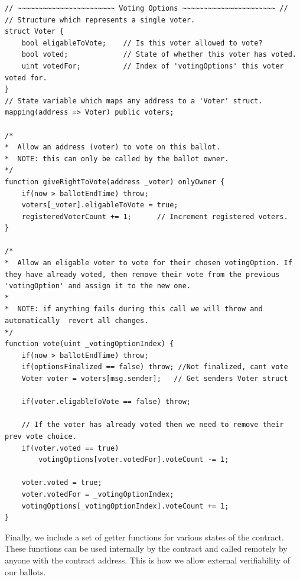 \documentclass{article}
\begin{document}
\begin{lstlisting}[caption=Contract code relating to voting.]
// ~~~~~~~~~~~~~~~~~~~~~~~ Voting Options ~~~~~~~~~~~~~~~~~~~~~~ //
// Structure which represents a single voter.
struct Voter {
    bool eligableToVote;    // Is this voter allowed to vote?
    bool voted;             // State of whether this voter has voted.
    uint votedFor;          // Index of 'votingOptions' this voter voted for.
}
// State variable which maps any address to a 'Voter' struct.
mapping(address => Voter) public voters;

/*
*  Allow an address (voter) to vote on this ballot.
*  NOTE: this can only be called by the ballot owner.
*/
function giveRightToVote(address _voter) onlyOwner {
    if(now > ballotEndTime) throw;
    voters[_voter].eligableToVote = true;
    registeredVoterCount += 1;      // Increment registered voters.
}

/*
*  Allow an eligable voter to vote for their chosen votingOption. If they have already voted, then remove their vote from the previous 'votingOption' and assign it to the new one.
*
*  NOTE: if anything fails during this call we will throw and automatically  revert all changes.
*/
function vote(uint _votingOptionIndex) {
    if(now > ballotEndTime) throw;
    if(optionsFinalized == false) throw; //Not finalized, cant vote
    Voter voter = voters[msg.sender];   // Get senders Voter struct

    if(voter.eligableToVote == false) throw;

    // If the voter has already voted then we need to remove their prev vote choice.
    if(voter.voted == true) 
        votingOptions[voter.votedFor].voteCount -= 1;

    voter.voted = true;
    voter.votedFor = _votingOptionIndex;
    votingOptions[_votingOptionIndex].voteCount += 1;
}
\end{lstlisting}

Finally, we include a set of getter functions for various states of the contract. These functions can be used internally by the contract and called remotely by anyone with the contract address. This is how we allow external verifiability of our ballots.
\end{document}
